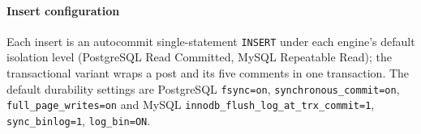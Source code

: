 \documentclass[11pt,a4paper]{article}
\begin{document}
\paragraph{Insert configuration}
Each insert is an autocommit single-statement \texttt{INSERT} under each engine's default
isolation level (PostgreSQL Read Committed, MySQL Repeatable Read); the transactional
variant wraps a post and its five comments in one transaction. The default durability
settings are PostgreSQL \texttt{fsync=on}, \texttt{synchronous\_commit=on},
\texttt{full\_page\_writes=on} and MySQL \texttt{innodb\_flush\_log\_at\_trx\_commit=1},
\texttt{sync\_binlog=1}, \texttt{log\_bin=ON}.
\end{document}
